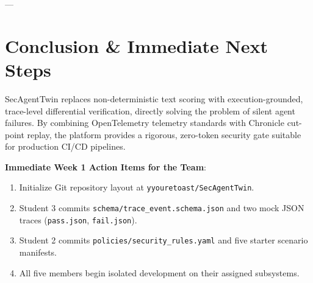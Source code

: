 \documentclass[11pt,a4paper]{article}
\begin{document}
---

\section{Conclusion \& Immediate Next Steps}
SecAgentTwin replaces non-deterministic text scoring with execution-grounded, trace-level differential verification, directly solving the problem of silent agent failures. By combining OpenTelemetry telemetry standards with Chronicle cut-point replay, the platform provides a rigorous, zero-token security gate suitable for production CI/CD pipelines.

\vspace{0.5em}
\noindent\textbf{Immediate Week 1 Action Items for the Team}:
\begin{enumerate}[leftmargin=1.5em,noitemsep]
    \item Initialize Git repository layout at \texttt{yyouretoast/SecAgentTwin}.
    \item Student 3 commits \texttt{schema/trace\_event.schema.json} and two mock JSON traces (\texttt{pass.json}, \texttt{fail.json}).
    \item Student 2 commits \texttt{policies/security\_rules.yaml} and five starter scenario manifests.
    \item All five members begin isolated development on their assigned subsystems.
\end{enumerate}
\end{document}

